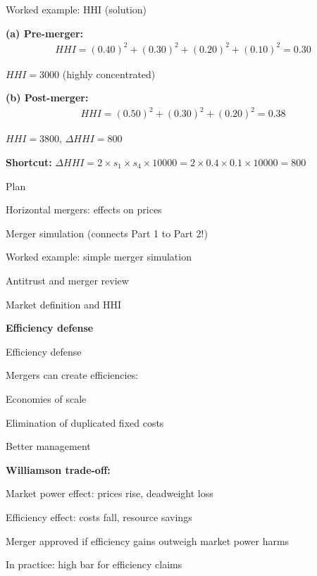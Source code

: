 \documentclass[notes,11pt, aspectratio=169]{beamer}
\newenvironment{wideitemize}{\itemize\addtolength{\itemsep}{10pt}}{\enditemize}
\newenvironment{wideenumerate}{\enumerate\addtolength{\itemsep}{10pt}}{\endenumerate}
\begin{document}
\begin{frame}{Worked example: HHI (solution)}
	\begin{wideitemize}
		\item \textbf{(a) Pre-merger:}
		\begin{align*}
			HHI = (0.40)^2 + (0.30)^2 + (0.20)^2 + (0.10)^2 = 0.30
		\end{align*}
		\item $HHI = 3000$ (highly concentrated)
		\item \textbf{(b) Post-merger:}
		\begin{align*}
			HHI = (0.50)^2 + (0.30)^2 + (0.20)^2 = 0.38
		\end{align*}
		\item $HHI = 3800$, $\Delta HHI = 800$
		\item \textbf{Shortcut:} $\Delta HHI = 2 \times s_1 \times s_4 \times 10000 = 2 \times 0.4 \times 0.1 \times 10000 = 800$
	\end{wideitemize}
\end{frame}

\begin{frame}{Plan}
  \begin{wideenumerate}
    \item Horizontal mergers: effects on prices
    \item Merger simulation (connects Part 1 to Part 2!)
    \item Worked example: simple merger simulation
    \item Antitrust and merger review
    \item Market definition and HHI
    \item \textbf{Efficiency defense}
  \end{wideenumerate}
\end{frame}

\begin{frame}{Efficiency defense}
	\begin{wideitemize}
		\item Mergers can create efficiencies:
		\begin{wideitemize}
			\vspace{5pt}
			\item Economies of scale
			\item Elimination of duplicated fixed costs
			\item Better management
		\end{wideitemize}
		\item \textbf{Williamson trade-off:}
		\begin{wideitemize}
			\vspace{5pt}
			\item Market power effect: prices rise, deadweight loss
			\item Efficiency effect: costs fall, resource savings
		\end{wideitemize}
		\item Merger approved if efficiency gains outweigh market power harms
		\item In practice: high bar for efficiency claims
	\end{wideitemize}
\end{frame}
\end{document}
